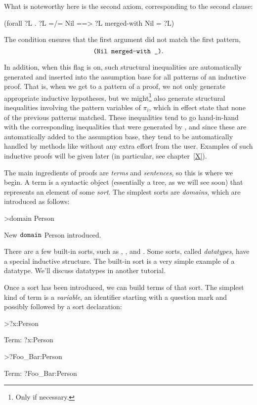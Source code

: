 What is noteworthy here is the second axiom, corresponding to the second
clause: 
\begin{tcAthena}
(forall ?L . ?L =/= Nil ==> ?L merged-with Nil = ?L)
\end{tcAthena}
The condition  ensures that the first argument  did
not match the first pattern, $$\mtt{(Nil merged-with \underscore)}. $$

In addition, when this flag is on, such structural inequalities are automatically
generated and inserted into the assumption base for all patterns of an inductive
proof. That is, when we get to a pattern  of a 
proof, we not only generate appropriate inductive hypotheses, but we might\footnote{Only
if necessary.} also  generate structural inequalities involving the pattern 
variables of $\pi_i$, which in effect state that none of the previous patterns matched. 
These inequalities tend to go hand-in-hand with the corresponding inequalities
that were generated by , and since these are automatically added
to the assumption base, they tend to be automatically handled by methods like
 without any extra effort from the user. Examples of such inductive
proofs will be given later (in particular, see chapter~\ref{X}). 




The main ingredients of proofs are \emph{terms} and \emph{sentences}, so this is where we begin. 
A term is a syntactic object (essentially a tree, as we will see soon) that represents an element 
of some \emph{sort}. The simplest sorts are \emph{domains}, which are introduced as follows:
\begin{tcAthena}[mathescape]
>domain Person 

New $\mbox{\tt domain}$ Person introduced.
\end{tcAthena}
There are a few built-in sorts, such as , , and .
Some sorts, called \emph{datatypes}, have a special inductive structure. 
The built-in sort  is a very simple example of a datatype.
We'll discuss datatypes in another tutorial. 

Once a sort has been introduced, we can build terms of that sort. The simplest kind of term is a \emph{variable}, an identifier
starting with a question mark and possibly followed by a sort declaration:
\begin{tcAthena}[upquote=true]
>?x:Person

Term: ?x:Person

>?Foo_Bar:Person 

Term: ?Foo_Bar:Person 
\end{tcAthena}

